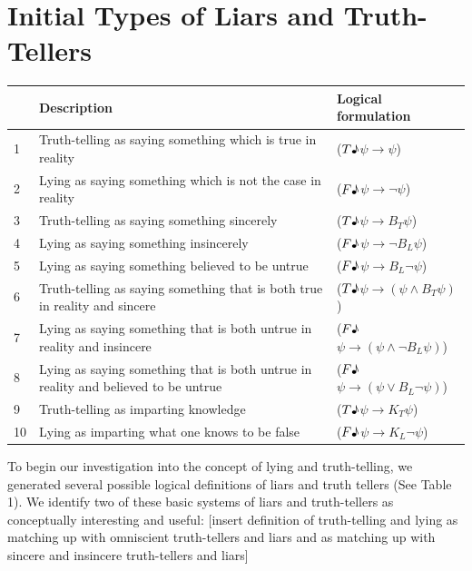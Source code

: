 \documentclass[12pt, titlepage, twoside, a4paper]{report}
\newcommand{\true}{$T\text{\textmusicalnote}$}
\newcommand{\false}{$F\text{\textmusicalnote}$}
\begin{document}
{\section{Initial Types of Liars and Truth-Tellers}
\begin{table}[h]
\begin{tabular}{lp{9cm}l}
\hline
   & Description                                                                        & Logical formulation                               \\ \hline
1  & Truth-telling as saying something which is true in reality                         & (\true$\psi \to \psi$)                            \\
2  & Lying as saying something which is not the case in reality                         & (\false$\psi \to \neg \psi$)                      \\ \hline
3  & Truth-telling as saying something sincerely                                        & (\true$\psi \to B_T \psi$)                     \\
4  & Lying as saying something insincerely                                              & (\false$\psi \to \neg B_L \psi$)               \\
5  & Lying as saying something believed to be untrue                                    & (\false$\psi \to  B_L \neg \psi$)              \\ \hline
6  & Truth-telling as saying something that is both true in reality and sincere         & (\true$\psi \to (\psi \wedge B_T \psi)$)       \\
7  & Lying as saying something that is both untrue in reality and insincere             & (\false$\psi \to (\psi \wedge \neg B_L \psi)$) \\
8  & Lying as saying something that is both untrue in reality and believed to be untrue & (\false$\psi \to (\psi \vee B_L \neg \psi)$)   \\ \hline
9  & Truth-telling as imparting knowledge                                               & (\true$\psi \to K_T \psi$)                     \\
10 & Lying as imparting what one knows to be false                                      & (\false$\psi \to K_L \neg \psi$)               \\ \hline
\end{tabular}
\end{table}
To begin our investigation into the concept of lying and truth-telling, we generated several possible logical definitions of liars and truth tellers (See Table 1). We identify two of these basic systems of liars and truth-tellers as conceptually interesting and useful: [insert definition of truth-telling and lying as matching up with omniscient truth-tellers and liars and as matching up with sincere and insincere truth-tellers and liars]

}
\end{document}
